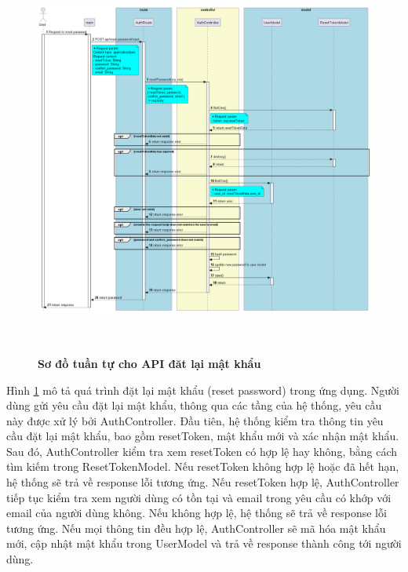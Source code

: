 \begin{figure}[H]
  \centering
  \includegraphics[width=16cm,height=13cm]{Images/server/sequence/server/resetPassword.png}
  \caption[Sơ đồ tuần tự cho API đăt lại mật khẩu ]{\bfseries \fontsize{12pt}{0pt}
  \selectfont Sơ đồ tuần tự cho API đăt lại mật khẩu }
  \label{resetPassword} %
\end{figure}
Hình \ref{resetPassword} mô tả quá trình đặt lại mật khẩu (reset password) trong ứng dụng. Người dùng gửi yêu cầu đặt lại mật khẩu, thông qua các tầng của hệ thống, yêu cầu này được xử lý bởi AuthController. Đầu tiên, hệ thống kiểm tra thông tin yêu cầu đặt lại mật khẩu, bao gồm resetToken, mật khẩu mới và xác nhận mật khẩu. Sau đó, AuthController kiểm tra xem resetToken có hợp lệ hay không, bằng cách tìm kiếm trong ResetTokenModel. Nếu resetToken không hợp lệ hoặc đã hết hạn, hệ thống sẽ trả về response lỗi tương ứng. Nếu resetToken hợp lệ, AuthController tiếp tục kiểm tra xem người dùng có tồn tại và email trong yêu cầu có khớp với email của người dùng không. Nếu không hợp lệ, hệ thống sẽ trả về response lỗi tương ứng. Nếu mọi thông tin đều hợp lệ, AuthController sẽ mã hóa mật khẩu mới, cập nhật mật khẩu trong UserModel và trả về response thành công tới người dùng.

